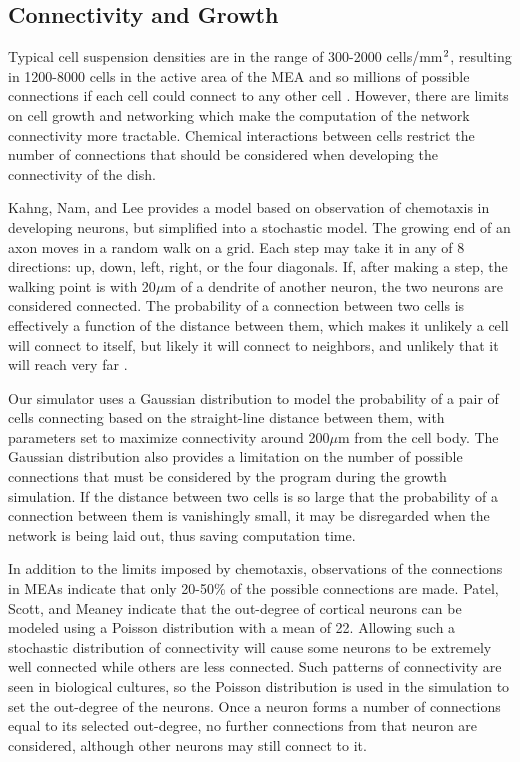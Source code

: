 \documentclass[letterpaper]{article}
\newcommand{\superscript}[1]{\ensuremath{^{\textrm{\scriptsize{#1}}}}}
\begin{document}
\subsection{Connectivity and Growth}

Typical cell suspension densities are in the range of 300-2000 cells/mm\superscript{2}, resulting in 1200-8000 cells in the active area of the MEA and so millions of possible connections if each cell could connect to any other cell \cite{wagenaar2006extremely}.
However, there are limits on cell growth and networking which make the computation of the network connectivity more tractable. 
Chemical interactions between cells restrict the number of connections that should be considered when developing the connectivity of the dish. 

Kahng, Nam, and Lee  provides a model based on observation of chemotaxis in developing neurons, but simplified into a stochastic model. 
The growing end of an axon moves in a random walk on a grid. 
Each step may take it in any of 8 directions: up, down, left, right, or the four diagonals.
If, after making a step, the walking point is with 20$\mu$m of a dendrite of another neuron, the two neurons are considered connected. 
The probability of a connection between two cells is effectively a function of the distance between them, which makes it unlikely a cell will connect to itself, but likely it will connect to neighbors, and unlikely that it will reach very far \cite{Segev2000185}. 

Our simulator uses a Gaussian distribution to model the probability of a pair of cells connecting based on the straight-line distance between them, with parameters set to maximize connectivity around 200$\mu$m from the cell body. 
The Gaussian distribution also provides a limitation on the number of possible connections that must be considered by the program during the growth simulation. 
If the distance between two cells is so large that the probability of a connection between them is vanishingly small, it may be disregarded when the network is being laid out, thus saving computation time. 

In addition to the limits imposed by chemotaxis, observations of the connections in MEAs indicate that only 20-50\% of the possible connections are made. 
Patel, Scott, and Meaney  indicate that the out-degree of cortical neurons can be modeled using a Poisson distribution with a mean of 22. 
Allowing such a stochastic distribution of connectivity will cause some neurons to be extremely well connected while others are less connected. 
Such patterns of connectivity are seen in biological cultures, so the Poisson distribution is used in the simulation to set the out-degree of the neurons. 
Once a neuron forms a number of connections equal to its selected out-degree, no further connections from that neuron are considered, although other neurons may still connect to it.
\end{document}
